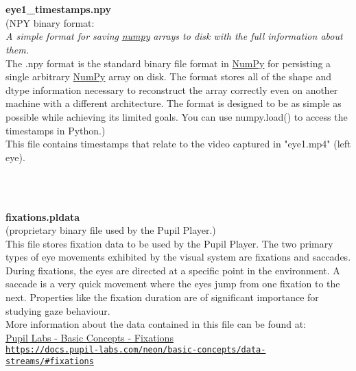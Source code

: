 \begin{description}
\begin{addmargin}[0em]{0em}
    \textbf{\\\\}
    \begin{addmargin}[1em]{0em} %
        \label{eye1_timestamps.npy}
        \textbf{eye1\_timestamps.npy}\\
        (NPY binary format:\\
        \textit{A simple format for saving}
        \href{https://numpy.org/doc/stable/reference/generated/numpy.lib.format.html#module-numpy.lib.format}{\textit{numpy}}
        \textit{arrays to disk with the full information about them.}\\
        The .npy format is the standard binary file format in 
        \href{https://numpy.org/doc/stable/reference/generated/numpy.lib.format.html#module-numpy.lib.format}{NumPy}
        for persisting a single arbitrary
        \href{https://numpy.org/doc/stable/reference/generated/numpy.lib.format.html#module-numpy.lib.format}{NumPy}
        array on disk. The format stores all of the shape and dtype information necessary to
        reconstruct the array correctly even on another machine with a different architecture.
        The format is designed to be as simple as possible while achieving its limited goals.
        You can use numpy.load() to access the timestamps in Python.)\\
        This file contains timestamps that relate to the video captured in "eye1.mp4" (left eye). 
    \end{addmargin} %

    \textbf{\\\\}
    \begin{addmargin}[1em]{0em} %
        \label{fixations.pldata}
        \textbf{fixations.pldata}\\(proprietary binary file used by the Pupil Player.)\\
        This file stores fixation data to be used by the Pupil Player.
        The two primary types of eye movements exhibited by the visual system are fixations and saccades.
        During fixations, the eyes are directed at a specific point in the environment.
        A saccade is a very quick movement where the eyes jump from one fixation to the next.
        Properties like the fixation duration are of significant importance for studying gaze behaviour.\\
        More information about the data contained in this file can be found at:\\
        \href{https://docs.pupil-labs.com/neon/basic-concepts/data-streams/#fixations}
        {{Pupil Labs - Basic Concepts - Fixations}\\\nolinkurl{https://docs.pupil-labs.com/neon/basic-concepts/data-streams/\#fixations}}
    \end{addmargin} %


\end{addmargin}
\end{description}
